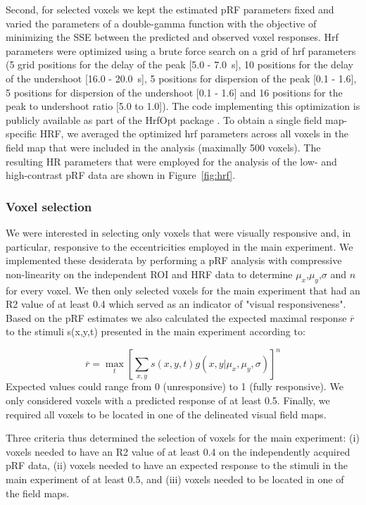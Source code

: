 Second, for selected voxels we kept the estimated pRF parameters fixed and varied the parameters of a double-gamma function with the objective of minimizing the SSE between the predicted and observed voxel responses. Hrf parameters were optimized using a brute force search on a grid of hrf parameters (5 grid positions for the delay of the peak [5.0 - 7.0~s], 10 positions for the delay of the undershoot [16.0 - 20.0~s], 5 positions for dispersion of the peak [0.1 - 1.6], 5 positions for dispersion of the undershoot [0.1 - 1.6] and 16 positions for the peak to undershoot ratio [5.0 to 1.0]). The code implementing this optimization is publicly available as part of the HrfOpt package \parencite{hrf_opt}. To obtain a single field map-specific HRF, we averaged the optimized hrf parameters across all voxels in the field map that were included in the analysis (maximally 500 voxels). The resulting HR parameters that were employed for the analysis of the low- and high-contrast pRF data are shown in Figure~\ref{fig:hrf}.

\subsubsection{Voxel selection}
We were interested in selecting only voxels that were visually responsive and, in particular, responsive to the eccentricities employed in the main experiment. We implemented these desiderata by performing a pRF analysis with compressive non-linearity on the independent ROI and HRF data to determine $\mu_x$,$\mu_y$,$\sigma$ and $n$ for every voxel. We then only selected voxels for the main experiment that had an R2 value of at least 0.4 which served as an indicator of "visual responsiveness". Based on the pRF estimates we also calculated the expected maximal response $\overline{r}$ to the stimuli s(x,y,t) presented in the main experiment according to:

\begin{equation}
\overline{r} = \max_t [\sum_{x,y} s(x,y,t) g(x, y|\mu_x,\mu_y,\sigma)]^n
\end{equation}
Expected values could range from 0 (unresponsive) to 1 (fully responsive). We only considered voxels with a predicted response of at least 0.5. Finally, we required all voxels to be located in one of the delineated visual field maps.

Three criteria thus determined the selection of voxels for the main experiment: (i) voxels needed to have an R2 value of at least 0.4 on the independently acquired pRF data, (ii) voxels needed to have an expected response to the stimuli in the main experiment of at least 0.5, and (iii) voxels needed to be located in one of the field maps.

